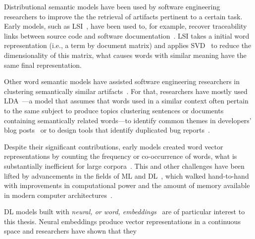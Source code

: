 Distributional semantic models have been used by software engineering researchers 
to improve the 
the retrieval of artifacts pertinent to a certain task. 
Early models, such as \acf{LSI}~\cite{deerwester1990LSI}, 
have been used to, for example, recover traceability links between source code and
software documentation~\cite{marcus2003}.  
\acs{LSI} takes a initial word representation (i.e., a term by document matrix) and applies \acf{SVD}~\cite{klema1980SVD}
to reduce the dimensionality of this matrix, what causes 
words with similar meaning have the same final representation.


Other word semantic models have assisted software engineering researchers in clustering semantically similar artifacts~\cite{zhang2014, layman2016}. For that, researchers have mostly used
\acf{LDA}~\cite{blei2003latent}---a model that assumes that words used in a similar context often pertain to the same subject to produce topics clustering sentences or documents containing semantically related words---to
identify common themes in developers' blog posts~\cite{Pagano2011} or to design tools that identify duplicated bug reports~\cite{nguyen2012, Thung2014}.






Despite their significant contributions, early models created word vector representations
by counting the frequency or co-occurrence of words, what is substantially inefficient for large corpora~\cite{Ye2016}.
This and other challenges have been lifted by advancements in the fields of \acf{ML} and \acf{DL}~\cite{ferreira2021, li2018deep}, which walked hand-to-hand with improvements in computational power and the amount of memory available in modern computer architectures~\cite{sharafi2015}.


\acs{DL} models built with \textit{neural, or word, embeddings}~\cite{Mikolov2013} 
are of particular interest to this thesis. 
Neural embeddings produce vector representations in a continuous space 
and researchers have shown that they 



